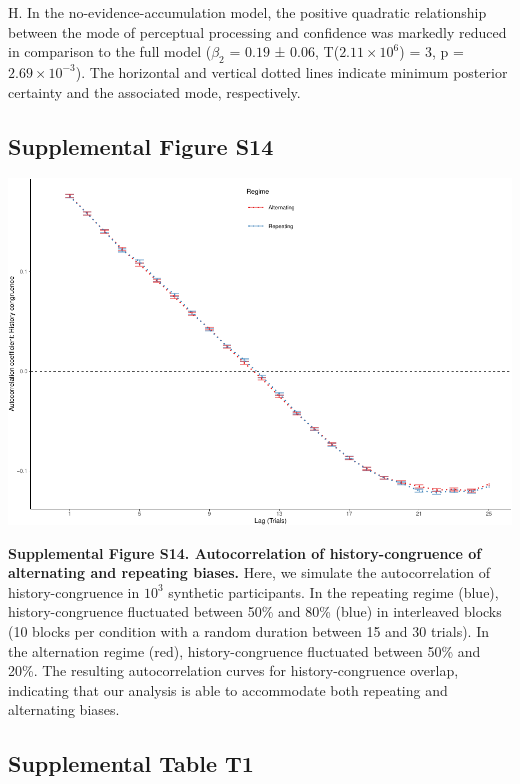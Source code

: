 \documentclass[
]{article}
\begin{document}
H. In the no-evidence-accumulation model, the positive quadratic
relationship between the mode of perceptual processing and confidence
was markedly reduced in comparison to the full model (\(\beta_2\) =
\(0.19\) ± \(0.06\), T(\(\ensuremath{2.11\times 10^{6}}\)) = \(3\), p =
\(\ensuremath{2.69\times 10^{-3}}\)). The horizontal and vertical dotted
lines indicate minimum posterior certainty and the associated mode,
respectively.

\newpage

\hypertarget{supplemental-figure-s14}{%
\subsection{Supplemental Figure S14}\label{supplemental-figure-s14}}

\includegraphics{modes_mouse_rev2_files/figure-latex/Supplemental_Figure_S14-1.pdf}

\textbf{Supplemental Figure S14. Autocorrelation of history-congruence
of alternating and repeating biases.} Here, we simulate the
autocorrelation of history-congruence in \(\ensuremath{10^{3}}\)
synthetic participants. In the repeating regime (blue),
history-congruence fluctuated between 50\% and 80\% (blue) in
interleaved blocks (10 blocks per condition with a random duration
between 15 and 30 trials). In the alternation regime (red),
history-congruence fluctuated between 50\% and 20\%. The resulting
autocorrelation curves for history-congruence overlap, indicating that
our analysis is able to accommodate both repeating and alternating
biases.

\newpage

\hypertarget{supplemental-table-t1}{%
\subsection{Supplemental Table T1}\label{supplemental-table-t1}}
\end{document}
